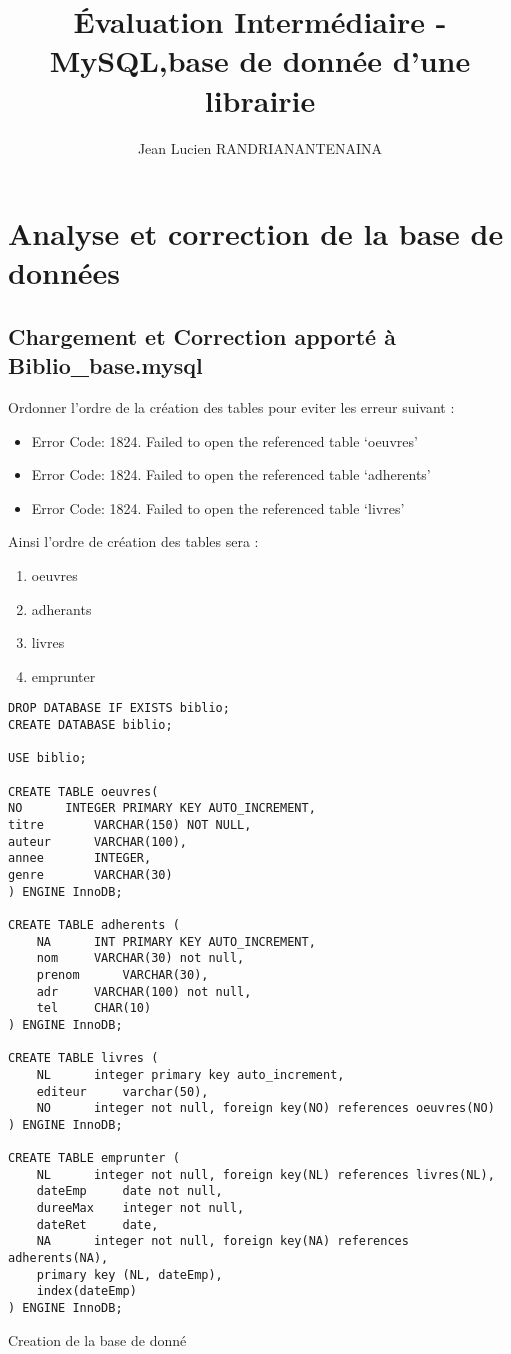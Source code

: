 \documentclass{article}
\title{Évaluation Intermédiaire - MySQL,base de donnée d’une librairie}
\author{Jean Lucien RANDRIANANTENAINA}
\begin{document}
\maketitle

\section{Analyse et correction de la base de données}

\subsection{Chargement et Correction apporté à Biblio\_base.mysql}

Ordonner l'ordre de la création des tables pour eviter les erreur
suivant :

\begin{itemize}
	\item Error Code: 1824. Failed to open the referenced table `oeuvres'
	\item Error Code: 1824. Failed to open the referenced table `adherents'
	\item Error Code: 1824. Failed to open the referenced table `livres'
\end{itemize}


Ainsi l'ordre de création des tables sera :
\begin{enumerate}
	\item oeuvres
	\item adherants
	\item livres
	\item emprunter
\end{enumerate}

\begin{listing}[H]
	\begin{verbatim}
DROP DATABASE IF EXISTS biblio;
CREATE DATABASE biblio;

USE biblio;

CREATE TABLE oeuvres(
NO 		INTEGER PRIMARY KEY AUTO_INCREMENT,
titre 		VARCHAR(150) NOT NULL,
auteur 		VARCHAR(100),
annee		INTEGER,
genre		VARCHAR(30)
) ENGINE InnoDB;

CREATE TABLE adherents (
	NA		INT PRIMARY KEY AUTO_INCREMENT,
	nom		VARCHAR(30) not null,
	prenom		VARCHAR(30),
	adr		VARCHAR(100) not null,
	tel		CHAR(10)
) ENGINE InnoDB;

CREATE TABLE livres (
	NL		integer primary key auto_increment,
	editeur		varchar(50),
	NO		integer not null, foreign key(NO) references oeuvres(NO)
) ENGINE InnoDB;

CREATE TABLE emprunter (
	NL		integer not null, foreign key(NL) references livres(NL),
	dateEmp		date not null,
	dureeMax	integer not null,
	dateRet 	date,
	NA		integer not null, foreign key(NA) references adherents(NA),
	primary key (NL, dateEmp),
	index(dateEmp)
) ENGINE InnoDB;
\end{verbatim}
	\caption{Creation de la base de donné}
\end{listing}
\end{document}
